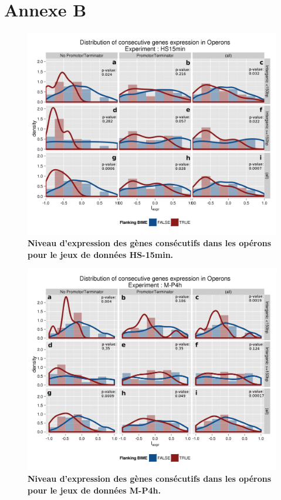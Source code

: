 \documentclass[12pt,a4paper]{report}
\begin{document}
\chapter*{Annexe B}
\label{annexeOperon}
\begin{figure}[h!]
\centerline{\includegraphics[scale=0.7]{figures/supData/genesOperon_histoDens_HS15.png}}
\caption{\textbf{Niveau d'expression des gènes consécutifs dans les opérons pour le jeux de données HS-15min.}}
\end{figure}

\begin{figure}[!h]
\centerline{\includegraphics[scale=0.7]{figures/supData/genesOperon_histoDens_M-P4h.png}}
\caption{\textbf{Niveau d'expression des gènes consécutifs dans les opérons pour le jeux de données M-P4h.}}
\end{figure}
\end{document}
